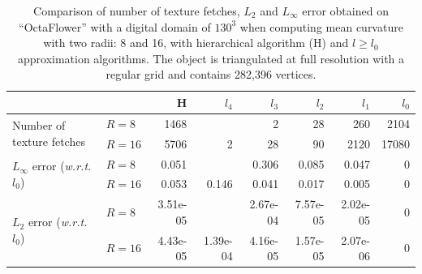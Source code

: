 \documentclass{llncs}
\newcommand{\wrt}{\emph{w.r.t.}\xspace}
\begin{document}
\begin{table}
  \begin{center}
  \setlength{\tabcolsep}{0.15cm}
	\begin{tabular}{@{}llrrrrrr@{}}
      \toprule
        & & H & $l_4$ & $l_3$ & $l_2$ & $l_1$ & $l_0$\\
      \midrule
      \multirow{2}{2.2cm}{Number of texture fetches} & $R=8$ & 1468 & & 2 & 28 & 260 & 2104 \\
                                & $R=16$ & 5706 & 2 & 28 & 90 & 2120 & 17080\\\midrule

      \multirow{2}{2.2cm}{$L_\infty$ error (\wrt $l_0$)} & $R=8$ & 0.051 & & 0.306 & 0.085 & 0.047 & 0\\
                                    & $R=16$ & 0.053 & 0.146 & 0.041 & 0.017 & 0.005 & 0\\\midrule

      \multirow{2}{2.1cm}{$L_2$ error (\wrt $l_0$)} & $R=8$ & 3.51e-05 & & 2.67e-04 & 7.57e-05 & 2.02e-05 & 0\\
                               & $R=16$ & 4.43e-05 & 1.39e-04 & 4.16e-05 & 1.57e-05 & 2.07e-06 & 0\\
      \bottomrule
    \end{tabular}
  \end{center}
  \caption{Comparison of number of texture fetches, $L_2$ and $L_\infty$ error
  obtained on ``OctaFlower'' with a digital domain of $130^3$ when computing mean
  curvature with two radii: 8 and 16, with hierarchical algorithm (H) and $l \ge
  l_0$ approximation algorithms. The object is triangulated at full resolution
  with a regular grid and contains 282,396 vertices.\label{tab:full-res-stat}}
\end{table}
\end{document}
